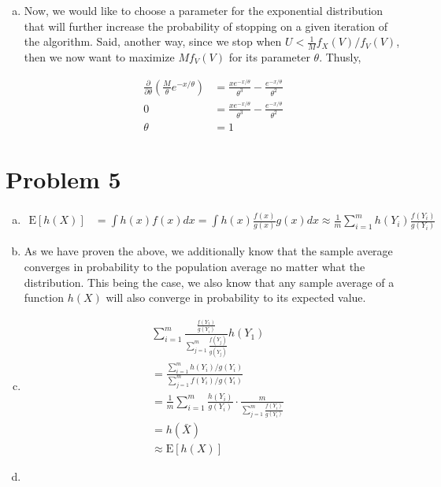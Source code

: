 \documentclass[11pt]{article}
\begin{document}
\begin{enumerate}[(a)]
  \item Now, we would like to choose a parameter for the exponential
    distribution that will further increase the probability of
    stopping on a given iteration of the algorithm.  Said, another
    way, since we stop when $U < \frac{1}{M} f_X(V)/f_V(V)$, then we
    now want to maximize $M f_V(V)$ for its parameter $\theta$.  Thusly,

    \begin{align*}
      \frac{\partial}{\partial \theta} \left( \frac{M}{\theta}
      e^{-x/\theta} \right) &= \frac{x e^{-x/\theta}}{\theta^3} -
                              \frac{e^{-x/\theta}}{\theta^2} \\
      0 &= \frac{x e^{-x/\theta}}{\theta^3}
          -\frac{e^{-x/\theta}}{\theta^2} \\
      \theta &= 1
    \end{align*}

\end{enumerate}

\section*{Problem 5}

\begin{enumerate}[(a)]
  \item 
    \begin{align*}
      \mathrm{E}[h(X)] &= \int h(x) f(x) dx = \int h(x)
      \frac{f(x)}{g(x)} g(x) dx \approx \frac{1}{m} \sum_{i=1}^m
      h(Y_i) \frac{f(Y_i)}{g(Y_i)}
    \end{align*}

  \item As we have proven the above, we additionally know that the
    sample average converges in probability to the population average
    no matter what the distribution.  This being the case, we also
    know that any sample average of a function $h(X)$ will also
    converge in probability to its expected value.

  \item 
    \begin{align*}
      &\sum_{i=1}^m \frac{\frac{f(Y_1)}{g(Y_i)}}{\sum_{j=1}^m
        \frac{f(Y_j)}{g(Y_j)}} h(Y_1) \\ 
      &= \frac{\sum_{i=1}^m
        h(Y_i)/g(Y_i)}{\sum_{j=1}^m f(Y_i)/g(Y_i)} \\
      &= \frac{1}{m} \sum_{i=1}^m \frac{h(Y_i)}{g(Y_i)} \cdot
      \frac{m}{\sum_{j=1}^m \frac{f(Y_i)}{g(Y_i)}} \\
      &= h(\bar{X}) \\
      &\approx \mathrm{E}[h(X)]
    \end{align*}

  \item

\end{enumerate}
\end{document}
